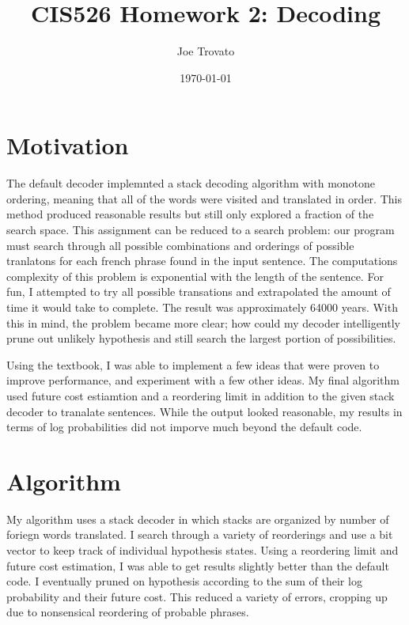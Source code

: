 \documentclass{article}
\begin{document}
\title{CIS526 Homework 2: Decoding}
\author{Joe Trovato}
\date{\today}
\maketitle
\setlength{\parindent}{10ex}

\section{Motivation}
\par
The default decoder implemnted a stack decoding algorithm with monotone ordering, meaning that all of the words were visited and translated in order. This method produced reasonable results but still only explored a fraction of the search space. This assignment can be reduced to a search problem: our program must search through all possible combinations and orderings of possible tranlatons for each french phrase found in the input sentence. The computations complexity of this problem is exponential with the length of the sentence. For fun, I attempted to try all possible transations and extrapolated the amount of time it would take to complete. The result was approximately 64000 years. With this in mind, the problem became more clear; how could my decoder intelligently prune out unlikely hypothesis and still search the largest portion of possibilities. 
\par
Using the textbook, I was able to implement a few ideas that were proven to improve performance, and experiment with a few other ideas. My final algorithm used future cost estiamtion and a reordering limit in addition to the given stack decoder to tranalate sentences. While the output looked reasonable, my results in terms of log probabilities did not imporve much beyond the default code. 


\section{Algorithm}
My algorithm uses a stack decoder in which stacks are organized by number of foriegn words translated. I search through a variety of reorderings and use a bit vector to keep track of individual hypothesis states. Using a reordering limit and future cost estimation, I was able to get results slightly better than the default code. I eventually pruned on hypothesis according to the sum of their log probability and their future cost. This reduced a variety of errors, cropping up due to nonsensical reordering of probable phrases. 
\end{document}
